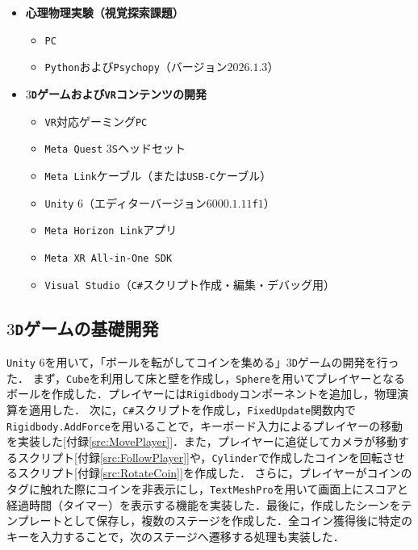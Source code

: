 \documentclass[paper=a4, fontsize=10pt]{jlreq}
\begin{document}
\begin{itemize}
  \item \textbf{心理物理実験（視覚探索課題）}
  \begin{itemize}
    \item \texttt{PC}
    \item \texttt{Python}および\texttt{Psychopy}（バージョン$2026.1.3$）
  \end{itemize}
  \item \textbf{$3$\texttt{D}ゲームおよび\texttt{VR}コンテンツの開発}
  \begin{itemize}
    \item \texttt{VR}対応ゲーミング\texttt{PC}
    \item \texttt{Meta Quest} $3$\texttt{S}ヘッドセット
    \item \texttt{Meta Link}ケーブル（または\texttt{USB-C}ケーブル）
    \item \texttt{Unity} $6$（エディターバージョン$6000.1.11$\texttt{f}$1$）
    \item \texttt{Meta Horizon Link}アプリ
    \item \texttt{Meta XR All-in-One SDK}
    \item \texttt{Visual Studio}（\texttt{C\#}スクリプト作成・編集・デバッグ用）
  \end{itemize}
\end{itemize}

\subsection{$3$\texttt{D}ゲームの基礎開発}
\texttt{Unity} $6$を用いて，「ボールを転がしてコインを集める」$3$\texttt{D}ゲームの開発を行った．
まず，\texttt{Cube}を利用して床と壁を作成し，\texttt{Sphere}を用いてプレイヤーとなるボールを作成した．プレイヤーには\texttt{Rigidbody}コンポーネントを追加し，物理演算を適用した．
次に，\texttt{C\#}スクリプトを作成し，\texttt{FixedUpdate}関数内で\texttt{Rigidbody.AddForce}を用いることで，キーボード入力によるプレイヤーの移動を実装した[付録\ref{src:MovePlayer}]．また，プレイヤーに追従してカメラが移動するスクリプト[付録\ref{src:FollowPlayer}]や，\texttt{Cylinder}で作成したコインを回転させるスクリプト[付録\ref{src:RotateCoin}]を作成した．
さらに，プレイヤーがコインのタグに触れた際にコインを非表示にし，\texttt{TextMeshPro}を用いて画面上にスコアと経過時間（タイマー）を表示する機能を実装した．最後に，作成したシーンをテンプレートとして保存し，複数のステージを作成した．全コイン獲得後に特定のキーを入力することで，次のステージへ遷移する処理も実装した．
\end{document}
